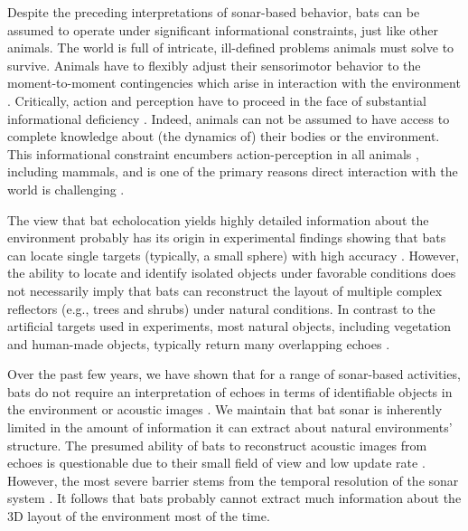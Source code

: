 \documentclass[letterpaper]{article}
\begin{document}
Despite the preceding interpretations of sonar-based behavior, bats can be assumed to operate under significant informational constraints, just like other animals. The world is full of intricate, ill-defined problems animals must solve to survive. Animals have to flexibly adjust their sensorimotor behavior to the moment-to-moment contingencies which arise in interaction with the environment \citep[e.g.,][]{Brooks1999,Beer1990,Pfeifer2006,DiPaolo2017}. Critically, action and perception have to proceed in the face of substantial informational deficiency \citep{Brooks1990,Sterling2015}. Indeed, animals can not be assumed to have access to complete knowledge about (the dynamics of) their bodies or the environment. This informational constraint encumbers action-perception in all animals \citep{Marks1988,Sterling2015}, including mammals, and is one of the primary reasons direct interaction with the world is challenging \citep{Alterovitz2016}. 

The view that bat echolocation yields highly detailed information about the environment probably has its origin in experimental findings showing that bats can locate single targets (typically, a small sphere) with high accuracy \citep[e.g.,][]{Simmons1983,Lawrence1982,Wotton2000}. However, the ability to locate and identify isolated objects under favorable conditions does not necessarily imply that bats can reconstruct the layout of multiple complex reflectors (e.g., trees and shrubs) under natural conditions. In contrast to the artificial targets used in experiments, most natural objects, including vegetation and human-made objects, typically return many overlapping echoes \citep{Yovel2011,Yovel2009,Vanderelst2016,Warnecke2018}.

Over the past few years, we have shown that for a range of sonar-based activities, bats do not require an interpretation of echoes in terms of identifiable objects in the environment or acoustic images  \citep[e.g.,][]{Vanderelst2015,Vanderelst2016,Steckel2013,Mansour2019a,Achutha2021}. We maintain that bat sonar is inherently limited in the amount of information it can extract about natural environments' structure. The presumed ability of bats to reconstruct acoustic images from echoes is questionable due to their small field of view \citep{Surlykke2009,Jakobsen2012,Jakobsen2013} and low update rate \citep{Holderied2006,Seibert2013}. However, the most severe barrier stems from the temporal resolution of the sonar system \citep{Simmons1989,Wiegrebe1996,Surlykke1996}.  It follows that bats probably cannot extract much information about the 3D layout of the environment most of the time. 
\end{document}
